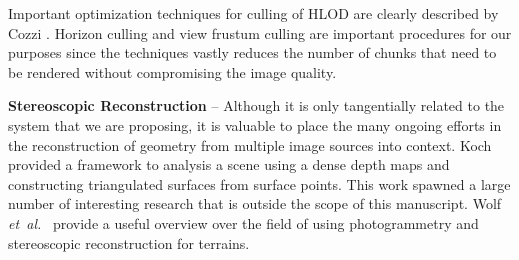 \documentclass[journal]{vgtc}                %
\newcommand{\etal}{\emph{et~al.}}
\begin{document}


Important optimization techniques for culling of HLOD are clearly described by Cozzi \cite{cozzi2008visibility}. Horizon culling and view frustum culling are important procedures for our purposes since the techniques vastly reduces the number of chunks that need to be rendered without compromising the image quality.




\noindent\textbf{Stereoscopic Reconstruction} -- Although it is only tangentially related to the system that we are proposing, it is valuable to place the many ongoing efforts in the reconstruction of geometry from multiple image sources into context. Koch \cite{Koch95} provided a framework to analysis a scene using a dense depth maps and constructing triangulated surfaces from surface points. This work spawned a large number of interesting research that is outside the scope of this manuscript. Wolf \etal~\cite{wolf2000elements} provide a useful overview over the field of using photogrammetry and stereoscopic reconstruction for terrains.
\end{document}
